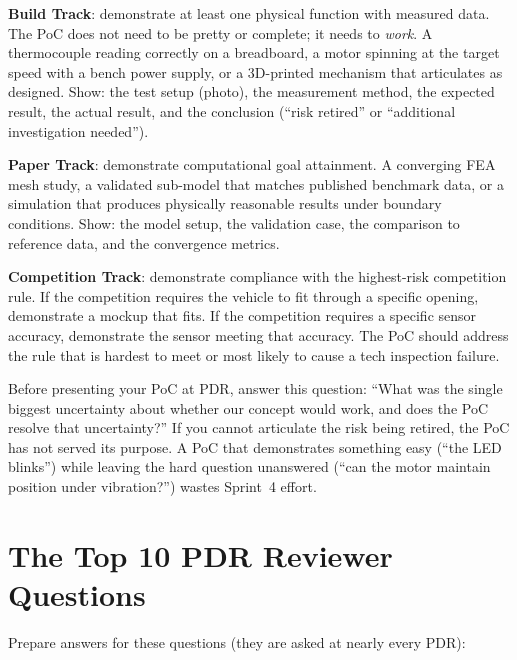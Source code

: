 \textbf{Build Track}: demonstrate at least one physical function with measured data. The PoC does not need to be pretty or complete; it needs to \emph{work}. A thermocouple reading correctly on a breadboard, a motor spinning at the target speed with a bench power supply, or a 3D-printed mechanism that articulates as designed. Show: the test setup (photo), the measurement method, the expected result, the actual result, and the conclusion (``risk retired'' or ``additional investigation needed'').

\textbf{Paper Track}: demonstrate computational goal attainment. A converging FEA mesh study, a validated sub-model that matches published benchmark data, or a simulation that produces physically reasonable results under boundary conditions. Show: the model setup, the validation case, the comparison to reference data, and the convergence metrics.

\textbf{Competition Track}: demonstrate compliance with the highest-risk competition rule. If the competition requires the vehicle to fit through a specific opening, demonstrate a mockup that fits. If the competition requires a specific sensor accuracy, demonstrate the sensor meeting that accuracy. The PoC should address the rule that is hardest to meet or most likely to cause a tech inspection failure.

\begin{keyconceptbox}
Before presenting your PoC at PDR, answer this question: ``What was the single biggest uncertainty about whether our concept would work, and does the PoC resolve that uncertainty?'' If you cannot articulate the risk being retired, the PoC has not served its purpose. A PoC that demonstrates something easy (``the LED blinks'') while leaving the hard question unanswered (``can the motor maintain position under vibration?'') wastes Sprint~4 effort.
\end{keyconceptbox}



\section{The Top 10 PDR Reviewer Questions}
Prepare answers for these questions (they are asked at nearly every PDR):

